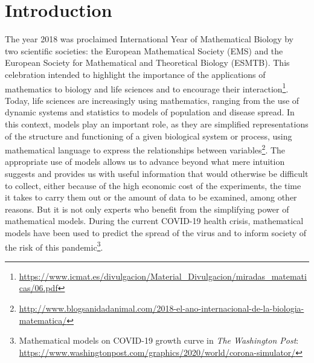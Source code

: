 \chapter{Introduction}
\label{cap:introduction}



The year 2018 was proclaimed International Year of Mathematical Biology by two scientific societies: the European Mathematical Society (EMS) and the European Society for Mathematical and Theoretical Biology (ESMTB). This celebration intended to highlight the importance of the applications of mathematics to biology and life sciences and to encourage their interaction\footnote{\url{https://www.icmat.es/divulgacion/Material_Divulgacion/miradas_matematicas/06.pdf}}. Today, life sciences are increasingly using mathematics, ranging from the use of dynamic systems and statistics to models of population and disease spread. In this context, models play an important role, as they are simplified representations of the structure and functioning of a given biological system or process, using mathematical language to express the relationships between variables\footnote{\url{http://www.blogsanidadanimal.com/2018-el-ano-internacional-de-la-biologia-matematica/}}. The appropriate use of models allows us to advance beyond what mere intuition suggests and provides us with useful information that would otherwise be difficult to collect, either because of the high economic cost of the experiments, the time it takes to carry them out or the amount of data to be examined, among other reasons. But it is not only experts who benefit from the simplifying power of mathematical models. During the current COVID-19 health crisis, mathematical models have been used to predict the spread of the virus and to inform society of the risk of this pandemic\footnote{Mathematical models on COVID-19 growth curve in \textit{The Washington Post}: \url{https://www.washingtonpost.com/graphics/2020/world/corona-simulator/}}. 



